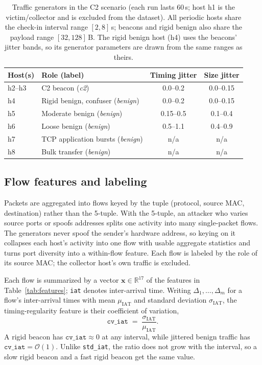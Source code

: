 \documentclass[preprint,12pt]{elsarticle}
\begin{document}
\begin{table}[htbp]
\centering
\caption{Traffic generators in the C2 scenario (each run lasts 60\,s; host h1 is the victim/collector
and is excluded from the dataset). All periodic hosts share the check-in interval range $[2,8]$\,s;
beacons and rigid benign also share the payload range $[32,128]$\,B. The rigid benign host (h4) uses the
beacons' jitter bands, so its generator parameters are drawn from the same ranges as theirs.}
\label{tab:scenario}
\begin{tabular}{llcc}
\toprule
Host(s) & Role (label) & Timing jitter & Size jitter \\
\midrule
h2--h3 & C2 beacon (\emph{c2})                 & 0.0--0.2  & 0.0--0.15 \\
h4     & Rigid benign, confuser (\emph{benign}) & 0.0--0.2  & 0.0--0.15 \\
h5     & Moderate benign (\emph{benign})        & 0.15--0.5 & 0.1--0.4  \\
h6     & Loose benign (\emph{benign})           & 0.5--1.1  & 0.4--0.9  \\
h7     & TCP application bursts (\emph{benign}) & n/a       & n/a       \\
h8     & Bulk transfer (\emph{benign})          & n/a       & n/a       \\
\bottomrule
\end{tabular}
\end{table}

\subsection{Flow features and labeling}
\label{sec:features}
Packets are aggregated into flows keyed by the tuple (protocol, source MAC, destination) rather than
the 5-tuple. With the 5-tuple, an attacker who varies source ports or spoofs addresses splits one
activity into many single-packet flows. The generators never spoof the sender's hardware address, so
keying on it collapses each host's activity into one flow with usable aggregate statistics and turns
port diversity into a within-flow feature. Each flow is labeled by the role of its source MAC; the
collector host's own traffic is excluded.

Each flow is summarized by a vector $\mathbf{x}\in\mathbb{R}^{17}$ of the features in
Table~\ref{tab:features}; \texttt{iat} denotes inter-arrival time. Writing $\Delta_1,\dots,\Delta_m$ for a
flow's inter-arrival times with mean $\mu_{\mathrm{IAT}}$ and standard deviation $\sigma_{\mathrm{IAT}}$,
the timing-regularity feature is their coefficient of variation,
\begin{equation}
\texttt{cv\_iat} \;=\; \frac{\sigma_{\mathrm{IAT}}}{\mu_{\mathrm{IAT}}}.
\label{eq:cviat}
\end{equation}
A rigid beacon has $\texttt{cv\_iat}\approx 0$ at any interval, while jittered benign traffic has
$\texttt{cv\_iat}=\mathcal{O}(1)$. Unlike \texttt{std\_iat}, the ratio does not grow with the interval,
so a slow rigid beacon and a fast rigid beacon get the same value.
\end{document}
